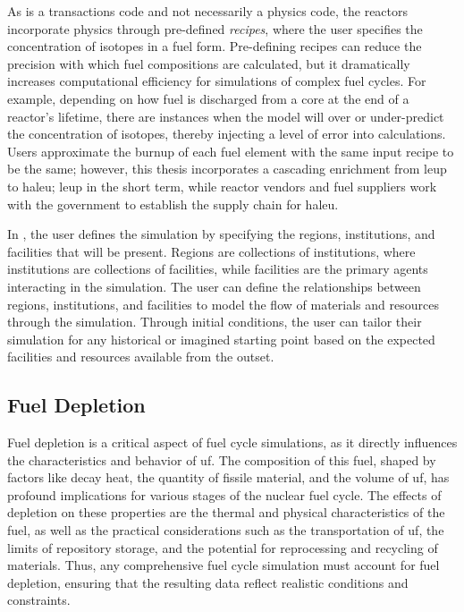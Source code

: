 As \cyclus is a transactions code and not necessarily a physics code,
the reactors incorporate physics through pre-defined \textit{recipes},
where the user specifies the concentration of isotopes in a fuel form.
Pre-defining recipes can reduce the precision with which
fuel compositions are calculated, but it dramatically increases computational
efficiency for simulations of complex fuel cycles. For example, depending
on how fuel is discharged from a core at the end of a reactor's lifetime, there
are instances when the model will over or under-predict the concentration of
isotopes, thereby injecting a level of error into calculations.
Users approximate the burnup of each fuel element with the same input recipe to
be the same; however, this thesis incorporates a cascading enrichment from
\gls{leup} to \gls{haleu}; \gls{leup} in the short term, while reactor vendors
and fuel suppliers work with the government to establish the supply chain for
\gls{haleu}.


In \cyclus, the user defines the simulation by specifying the regions,
institutions, and facilities that will be present. Regions
are collections of institutions, where institutions are collections of
facilities, while facilities are the primary agents interacting in the
simulation. The user can define the relationships between regions,
institutions, and facilities to model the flow of materials and resources
through the simulation. Through initial conditions, the user can tailor their
simulation for any historical or imagined starting point based on the expected
facilities and resources available from the outset.

\subsection{Fuel Depletion}
\label{sec:depletion}

Fuel depletion is a critical aspect of fuel cycle simulations, as it directly
influences the characteristics and behavior of \gls{uf}. The composition of
this fuel, shaped by factors like decay heat, the quantity of fissile material,
and the volume of \gls{uf}, has profound implications for various stages of the
nuclear fuel cycle. The effects of depletion on these properties are the
thermal and physical characteristics of the fuel, as well as the practical
considerations such as the transportation of \gls{uf}, the limits of repository
storage, and the potential for reprocessing and recycling of materials. Thus,
any comprehensive fuel cycle simulation must account for fuel depletion,
ensuring that the resulting data reflect realistic conditions and constraints.

